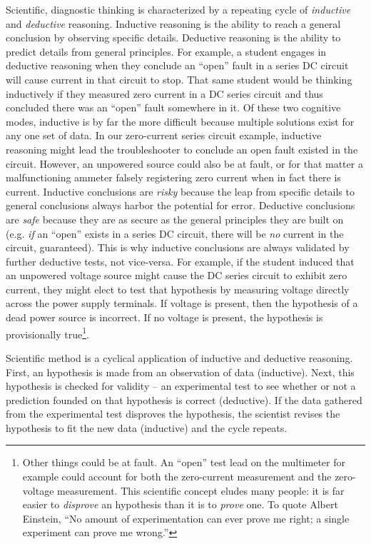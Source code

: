 Scientific, diagnostic thinking is characterized by a repeating cycle of \textit{inductive} and \textit{deductive} reasoning.  Inductive reasoning is the ability to reach a general conclusion by observing specific details.  Deductive reasoning is the ability to predict details from general principles.  For example, a student engages in deductive reasoning when they conclude an ``open'' fault in a series DC circuit will cause current in that circuit to stop.  That same student would be thinking inductively if they measured zero current in a DC series circuit and thus concluded there was an ``open'' fault somewhere in it.  Of these two cognitive modes, inductive is by far the more difficult because multiple solutions exist for any one set of data.  In our zero-current series circuit example, inductive reasoning might lead the troubleshooter to conclude an open fault existed in the circuit.  However, an unpowered source could also be at fault, or for that matter a malfunctioning ammeter falsely registering zero current when in fact there is current.  Inductive conclusions are \textit{risky} because the leap from specific details to general conclusions always harbor the potential for error.  Deductive conclusions are \textit{safe} because they are as secure as the general principles they are built on (e.g. \textit{if} an ``open'' exists in a series DC circuit, there will be \textit{no} current in the circuit, guaranteed).  This is why inductive conclusions are always validated by further deductive tests, not vice-versa.  For example, if the student induced that an unpowered voltage source might cause the DC series circuit to exhibit zero current, they might elect to test that hypothesis by measuring voltage directly across the power supply terminals.  If voltage is present, then the hypothesis of a dead power source is incorrect.  If no voltage is present, the hypothesis is provisionally true\footnote{Other things could be at fault.  An ``open'' test lead on the multimeter for example could account for both the zero-current measurement and the zero-voltage measurement.  This scientific concept eludes many people: it is far easier to \textit{disprove} an hypothesis than it is to \textit{prove} one.  To quote Albert Einstein, ``No amount of experimentation can ever prove me right; a single experiment can prove me wrong.''}.

Scientific method is a cyclical application of inductive and deductive reasoning.  First, an hypothesis is made from an observation of data (inductive).  Next, this hypothesis is checked for validity -- an experimental test to see whether or not a prediction founded on that hypothesis is correct (deductive).  If the data gathered from the experimental test disproves the hypothesis, the scientist revises the hypothesis to fit the new data (inductive) and the cycle repeats.

